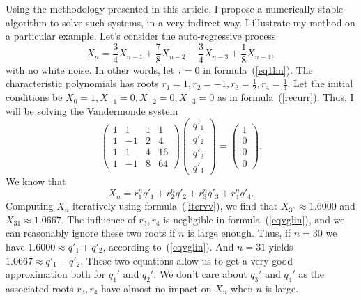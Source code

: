 \documentclass[oneside,10pt]{book}
\begin{document}
Using the methodology presented in this article, I propose a numerically stable algorithm to solve such systems, in a very indirect way. I illustrate my method on a particular example. Let's consider the auto-regressive process 
\begin{equation}\label{itervv}
X_n=\frac{3}{4}X_{n-1} + \frac{7}{8} X_{n-2} -\frac{3}{4} X_{n-3} +\frac{1}{8} X_{n-4},
\end{equation}
with no white noise. In other words, let $\tau=0$ in formula~(\ref{eq1lin}). The characteristic polynomials has roots $r_1=1,r_2=-1,r_3=\frac{1}{2},r_4=\frac{1}{4}$. Let the initial conditions be $X_0=1,X_{-1}=0, X_{-2}=0, X_{-3}=0$ as in formula~(\ref{recurr}). Thus, I will be solving the Vandermonde system
\begin{equation}\label{refrecu}
\left(
\begin{array}{rrrr}
      1 & 1 & 1 & 1 \\
     1 & -1 & 2 & 4 \\
     1 & 1 & 4  & 16 \\
    1 &  -1 & 8  &  64
\end{array}
\right) 
\left(
\begin{aligned}
      q'_1\\
     q'_2 \\
     q'_3 \\
    q'_4
\end{aligned}
\right) =
\left(
\begin{array}{c}
      1 \\
     0\\
     0 \\
    0
\end{array}
\right).
\end{equation}
We know that 
\begin{equation}\label{eqvglin}
X_n=r_1^nq'_1 + r_2^n q'_2 + r_3^n q'_3+r_4^n q'_4.
\end{equation}
Computing $X_n$ iteratively using formula~(\ref{itervv}), we find that
$X_{30}\approx 1.6000$ and $X_{31}\approx 1.0667$. The influence of $r_3, r_4$ is negligible in formula~(\ref{eqvglin}), and we can reasonably ignore these two roots if $n$ is large enough. Thus, if $n=30$ we have $1.6000 \approx q'_1 + q'_2$, according to~(\ref{eqvglin}). And $n=31$ yields $1.0667 \approx q'_1 - q'_2$. These two equations allow us to get a very good approximation both for $q_1'$ and $q_2'$. We don't care about $q_3'$ and $q_4'$ as the associated roots $r_3,r_4$ have almost no impact on $X_n$ when $n$ is large. 
\end{document}
